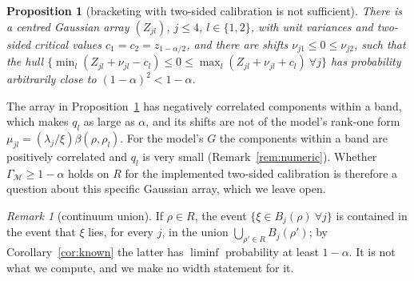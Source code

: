 \documentclass[11pt]{article}
\newtheorem{proposition}{Proposition}
\theoremstyle{definition}
\theoremstyle{remark}
\newtheorem{remark}{Remark}
\numberwithin{equation}{section}
\newcommand{\Mesh}{\mathcal{M}}
\begin{document}
\begin{proposition}[bracketing with two-sided calibration is not sufficient]\label{prop:cex}
There is a centred Gaussian array $(Z_{jl})$, $j\le4$, $l\in\{1,2\}$, with unit variances and two-sided critical values $c_1=c_2=z_{1-\alpha/2}$, and there are shifts $\nu_{j1}\le0\le\nu_{j2}$, such that the hull $\{\min_l(Z_{jl}+\nu_{jl}-c_l)\le0\le\max_l(Z_{jl}+\nu_{jl}+c_l)\ \forall j\}$ has probability arbitrarily close to $(1-\alpha)^2<1-\alpha$.
\end{proposition}

The array in Proposition~\ref{prop:cex} has negatively correlated components within a band, which makes $q_l$ as large as $\alpha$, and its shifts are not of the model's rank-one form $\mu_{jl}=(\lambda_j/\xi)\beta(\rho,\rho_l)$. For the model's $G$ the components within a band are positively correlated and $q_l$ is very small (Remark~\ref{rem:numeric}). Whether $\Gamma_\Mesh\ge1-\alpha$ holds on $R$ for the implemented two-sided calibration is therefore a question about this specific Gaussian array, which we leave open.

\begin{remark}[continuum union]
If $\rho\in R$, the event $\{\xi\in B_j(\rho)\ \forall j\}$ is contained in the event that $\xi$ lies, for every $j$, in the union $\bigcup_{\rho'\in R}B_j(\rho')$; by Corollary~\ref{cor:known} the latter has $\liminf$ probability at least $1-\alpha$. It is not what we compute, and we make no width statement for it.
\end{remark}
\end{document}
